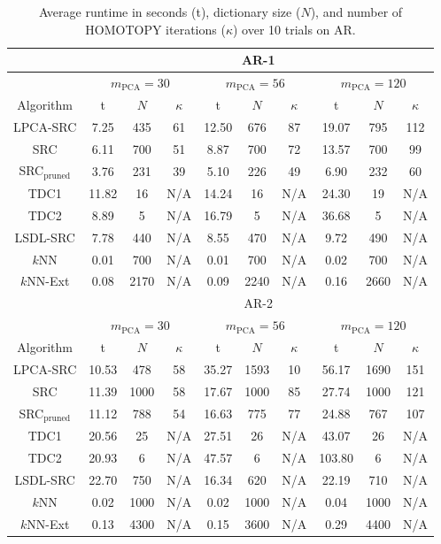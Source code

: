 \documentclass[review]{elsarticle}
\begin{document}
\begin{table}[!htb] 
\footnotesize{
\centering
\begin{tabular}{|c|c|c|c|c|c|c|c|c|c|}
\hline
& \multicolumn{9}{|c|}{AR-1}\\
\hline
& \multicolumn{3}{|c|}{$m_\mathrm{PCA} = 30$} &  \multicolumn{3}{|c|}{$m_\mathrm{PCA} = 56$}    & \multicolumn{3}{|c|}{$m_\mathrm{PCA} = 120$}\\
\hline
Algorithm & t & $N$ & $\kappa$ & t & $N$ & $\kappa$ & t & $N$ & $\kappa$ \\
\hline
LPCA-SRC	          & 7.25	& 435	& 61	& 12.50	& 676	& 87	& 19.07	& 795	& 112	\\
SRC	                & 6.11	& 700	& 51	& 8.87	& 700	& 72  & 13.57	& 700	& 99\\
SRC$_\mathrm{pruned}$	& 3.76	& 231	& 39	& 5.10	& 226	& 49	& 6.90	& 232	& 60 \\
TDC1	              &	11.82	&	16	&	N/A	&	14.24	&	16	&	N/A &	24.30	&	19	&	N/A	\\
TDC2	              &	8.89	&	5	  &	N/A	&	16.79	&	5	  &	N/A &	36.68	&	5	  &	N/A	 \\
LSDL-SRC	          & 7.78	& 440	& N/A & 8.55	& 470	& N/A & 9.72	& 490	& N/A \\
$k$NN               & 0.01	& 700 & N/A	&	0.01	& 700 & N/A	&	0.02	& 700 & N/A \\
$k$NN-Ext           & 0.08	& 2170 & N/A	&	0.09	& 2240 & N/A	&	0.16	& 2660 & N/A \\


\hline
& \multicolumn{9}{|c|}{AR-2}\\
\hline
& \multicolumn{3}{|c|}{$m_\mathrm{PCA} = 30$} &  \multicolumn{3}{|c|}{$m_\mathrm{PCA} = 56$}    & \multicolumn{3}{|c|}{$m_\mathrm{PCA} = 120$}\\
\hline
Algorithm & t & $N$ & $\kappa$ & t & $N$ & $\kappa$ & t & $N$ & $\kappa$ \\
\hline
LPCA-SRC	          & 10.53	 & 478	& 58  & 35.27	 & 1593	  & 10     & 56.17	  & 1690	& 151 \\
SRC	                & 11.39	 & 1000	& 58  & 17.67	 & 1000	  & 85     & 27.74  	& 1000	& 121 \\
SRC$_\mathrm{pruned}$	& 11.12	 & 788	& 54  & 16.63	 & 775	  & 77     & 24.88	  & 767	  & 107 \\
TDC1	              &	20.56	 &	25	&	N/A &	27.51	 &	26	  &	N/A    &	43.07	  &	26	  &	N/A \\
TDC2	              &	20.93	 &	6	  &	N/A &	47.57	 &	6	    &	N/A    &	103.80	&	6	    &	N/A \\
LSDL-SRC	          & 22.70	 & 750	& N/A & 16.34	 & 620	  & N/A    & 22.19	  & 710	  & N/A \\
$k$NN               &	 0.02  & 1000  & N/A	&	0.02	 & 1000    & N/A 	 &	0.04	  & 1000   & N/A \\
$k$NN-Ext           & 0.13	 & 4300  & N/A	&	0.15	 & 3600    & N/A    &	0.29	  & 4400   & N/A \\

\hline
\end{tabular}
\caption{Average runtime in seconds (t), dictionary size ($N$), and number of HOMOTOPY iterations ($\kappa$) over 10 trials on AR.} 
\label{AR_results_time}}
\end{table}
\end{document}
